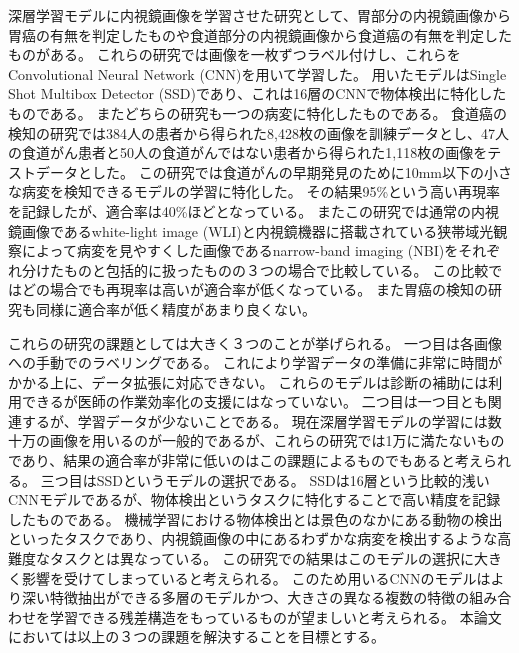 深層学習モデルに内視鏡画像を学習させた研究として、胃部分の内視鏡画像から胃癌の有無を判定したもの\cite{stomach_cancer}や食道部分の内視鏡画像から食道癌の有無を判定したもの\cite{stomach_cancer}がある。
これらの研究では画像を一枚ずつラベル付けし、これらをConvolutional Neural Network (CNN)\cite{CNN}を用いて学習した。
用いたモデルはSingle Shot Multibox Detector (SSD)\cite{SSD}であり、これは16層のCNNで物体検出に特化したものである。
またどちらの研究も一つの病変に特化したものである。
食道癌の検知の研究では384人の患者から得られた8,428枚の画像を訓練データとし、47人の食道がん患者と50人の食道がんではない患者から得られた1,118枚の画像をテストデータとした。
この研究では食道がんの早期発見のために10mm以下の小さな病変を検知できるモデルの学習に特化した。
その結果95\%という高い再現率を記録したが、適合率は40\%ほどとなっている。
またこの研究では通常の内視鏡画像であるwhite-light image (WLI)と内視鏡機器に搭載されている狭帯域光観察によって病変を見やすくした画像であるnarrow-band imaging (NBI)をそれぞれ分けたものと包括的に扱ったものの３つの場合で比較している。
この比較ではどの場合でも再現率は高いが適合率が低くなっている。
また胃癌の検知の研究も同様に適合率が低く精度があまり良くない。

これらの研究の課題としては大きく３つのことが挙げられる。
一つ目は各画像への手動でのラベリングである。
これにより学習データの準備に非常に時間がかかる上に、データ拡張に対応できない。
これらのモデルは診断の補助には利用できるが医師の作業効率化の支援にはなっていない。
二つ目は一つ目とも関連するが、学習データが少ないことである。
現在深層学習モデルの学習には数十万の画像を用いるのが一般的であるが、これらの研究では1万に満たないものであり、結果の適合率が非常に低いのはこの課題によるものでもあると考えられる。
三つ目はSSDというモデルの選択である。
SSDは16層という比較的浅いCNNモデルであるが、物体検出というタスクに特化することで高い精度を記録したものである。
機械学習における物体検出とは景色のなかにある動物の検出といったタスクであり、内視鏡画像の中にあるわずかな病変を検出するような高難度なタスクとは異なっている。
この研究での結果はこのモデルの選択に大きく影響を受けてしまっていると考えられる。
このため用いるCNNのモデルはより深い特徴抽出ができる多層のモデルかつ、大きさの異なる複数の特徴の組み合わせを学習できる残差構造をもっているものが望ましいと考えられる。
本論文においては以上の３つの課題を解決することを目標とする。

